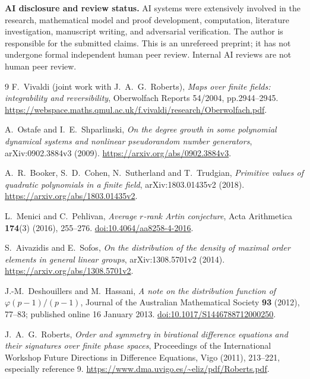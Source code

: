 \documentclass[11pt]{article}
\theoremstyle{remark}
\begin{document}
\medskip\noindent\textbf{AI disclosure and review status.}
AI systems were extensively involved in the research, mathematical
model and proof development, computation, literature investigation,
manuscript writing, and adversarial verification. The author is
responsible for the submitted claims. This is an unrefereed preprint;
it has not undergone formal independent human peer review.
Internal AI reviews are not human peer review.

\begin{thebibliography}{9}
 F.~Vivaldi (joint work with J.~A.~G.~Roberts),
\emph{Maps over finite fields: integrability and reversibility},
Oberwolfach Reports 54/2004, pp.2944--2945.
\url{https://webspace.maths.qmul.ac.uk/f.vivaldi/research/Oberwolfach.pdf}.

 A.~Ostafe and I.~E.~Shparlinski,
\emph{On the degree growth in some polynomial dynamical systems and
nonlinear pseudorandom number generators}, arXiv:0902.3884v3 (2009).
\url{https://arxiv.org/abs/0902.3884v3}.

 A.~R.~Booker, S.~D.~Cohen, N.~Sutherland and T.~Trudgian,
\emph{Primitive values of quadratic polynomials in a finite field},
arXiv:1803.01435v2 (2018).
\url{https://arxiv.org/abs/1803.01435v2}.

 L.~Menici and C.~Pehlivan,
\emph{Average $r$-rank Artin conjecture}, Acta Arithmetica
\textbf{174}(3) (2016), 255--276.
\href{https://doi.org/10.4064/aa8258-4-2016}{doi:10.4064/aa8258-4-2016}.

 S.~Aivazidis and E.~Sofos,
\emph{On the distribution of the density of maximal order elements in
general linear groups}, arXiv:1308.5701v2 (2014).
\url{https://arxiv.org/abs/1308.5701v2}.

 J.-M.~Deshouillers and M.~Hassani,
\emph{A note on the distribution function of $\varphi(p-1)/(p-1)$},
Journal of the Australian Mathematical Society \textbf{93} (2012),
77--83; published online 16 January 2013.
\href{https://doi.org/10.1017/S1446788712000250}{doi:10.1017/S1446788712000250}.

 J.~A.~G.~Roberts,
\emph{Order and symmetry in birational difference equations and their
signatures over finite phase spaces}, Proceedings of the International
Workshop Future Directions in Difference Equations, Vigo (2011),
213--221, especially reference 9.
\url{https://www.dma.uvigo.es/~eliz/pdf/Roberts.pdf}.
\end{thebibliography}
\end{document}
